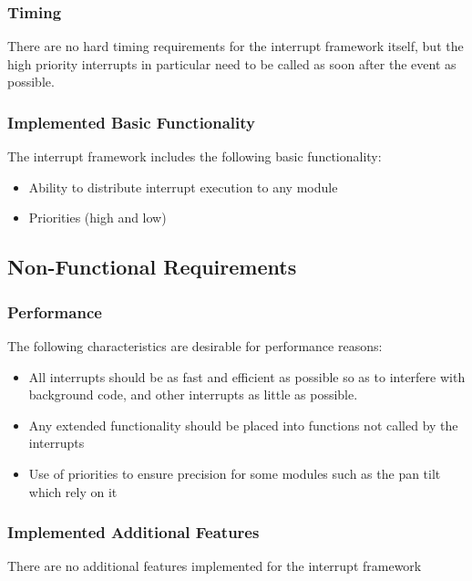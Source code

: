 \documentclass[]{report}
\begin{document}
\subsubsection{Timing}
There are no hard timing requirements for the interrupt framework itself, but the high priority interrupts in particular need to be called as soon after the event as possible.

\subsubsection{Implemented Basic Functionality}
The interrupt framework includes the following basic functionality:
\begin{itemize}
	\item Ability to distribute interrupt execution to any module
	\item Priorities (high and low)
\end{itemize}

\subsection{Non-Functional Requirements}
\subsubsection{Performance}
The following characteristics are desirable for performance reasons:
\begin{itemize}
	\item All interrupts should be as fast and efficient as possible so as to interfere with background code, and other interrupts as little as possible.
	\item Any extended functionality should be placed into functions not called by the interrupts
	\item Use of priorities to ensure precision for some modules such as the pan tilt which rely on it
\end{itemize}


\subsubsection{Implemented Additional Features}
There are no additional features implemented for the interrupt framework
\end{document}

